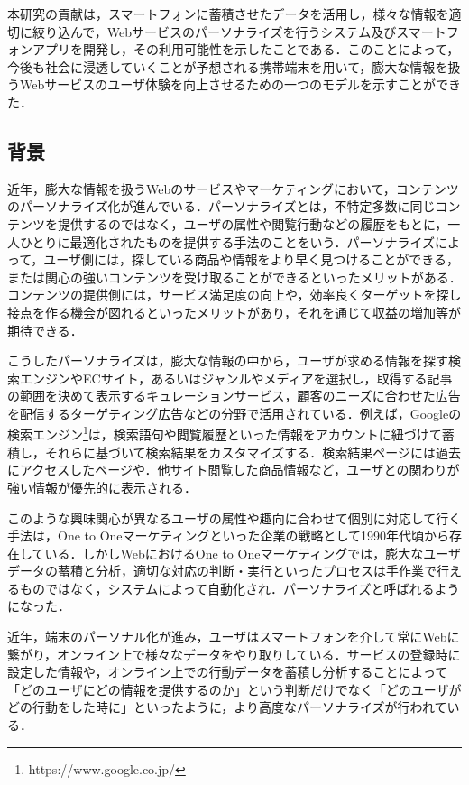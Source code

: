 \documentclass[a4paper]{jsarticle}
\begin{document}
本研究の貢献は，スマートフォンに蓄積させたデータを活用し，様々な情報を適切に絞り込んで，Webサービスのパーソナライズを行うシステム及びスマートフォンアプリを開発し，その利用可能性を示したことである．このことによって，今後も社会に浸透していくことが予想される携帯端末を用いて，膨大な情報を扱うWebサービスのユーザ体験を向上させるための一つのモデルを示すことができた．



\subsection{背景}
近年，膨大な情報を扱うWebのサービスやマーケティングにおいて，コンテンツのパーソナライズ化が進んでいる．パーソナライズとは，不特定多数に同じコンテンツを提供するのではなく，ユーザの属性や閲覧行動などの履歴をもとに，一人ひとりに最適化されたものを提供する手法のことをいう．パーソナライズによって，ユーザ側には，探している商品や情報をより早く見つけることができる，または関心の強いコンテンツを受け取ることができるといったメリットがある．コンテンツの提供側には，サービス満足度の向上や，効率良くターゲットを探し接点を作る機会が図れるといったメリットがあり，それを通じて収益の増加等が期待できる\cite{izumi}．

こうしたパーソナライズは，膨大な情報の中から，ユーザが求める情報を探す検索エンジンやECサイト，あるいはジャンルやメディアを選択し，取得する記事の範囲を決めて表示するキュレーションサービス，顧客のニーズに合わせた広告を配信するターゲティング広告などの分野で活用されている．例えば，Googleの検索エンジン\footnote{https://www.google.co.jp/}は，検索語句や閲覧履歴といった情報をアカウントに紐づけて蓄積し，それらに基づいて検索結果をカスタマイズする．検索結果ページには過去にアクセスしたページや．他サイト閲覧した商品情報など，ユーザとの関わりが強い情報が優先的に表示される．

このような興味関心が異なるユーザの属性や趣向に合わせて個別に対応して行く手法は，One to Oneマーケティングといった企業の戦略として1990年代頃から存在している\cite{okunuki}．しかしWebにおけるOne to Oneマーケティングでは，膨大なユーザデータの蓄積と分析，適切な対応の判断・実行といったプロセスは手作業で行えるものではなく，システムによって自動化され．パーソナライズと呼ばれるようになった．

近年，端末のパーソナル化が進み，ユーザはスマートフォンを介して常にWebに繋がり，オンライン上で様々なデータをやり取りしている．サービスの登録時に設定した情報や，オンライン上での行動データを蓄積し分析することによって「どのユーザにどの情報を提供するのか」という判断だけでなく「どのユーザがどの行動をした時に」といったように，より高度なパーソナライズが行われている\cite{mochimaru}．
\end{document}
